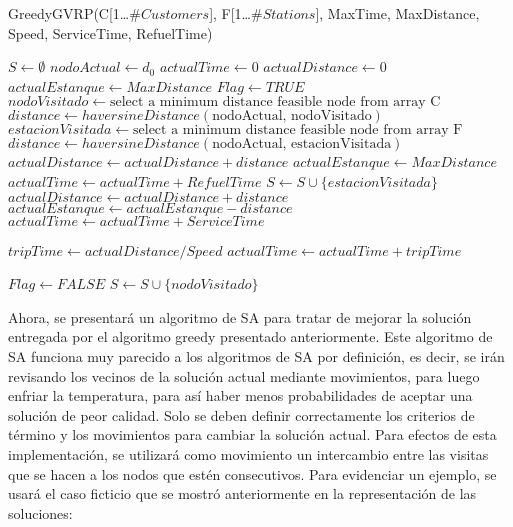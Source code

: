 \documentclass[letter, 10pt]{article}
\begin{document}
\begin{algorithm}
\caption{GreedyGVRP(C[1\ldots $\#Customers$], F[1\ldots $\#Stations$], MaxTime, MaxDistance, Speed,  ServiceTime, RefuelTime)}\label{alg:cap}
    \begin{algorithmic}
        \State $S \gets \emptyset$
        \State $nodoActual \gets d_0$
        \State $actualTime \gets 0$
        \State $actualDistance \gets 0$
        \State $actualEstanque \gets MaxDistance$
        \State $Flag \gets TRUE$
            \State $nodoVisitado \gets \text{select a minimum distance feasible node from array C}$
            \State $distance \gets haversineDistance(\text{nodoActual, nodoVisitado})$
                \State $estacionVisitada \gets \text{select a minimum distance feasible node from array F}$
                \State $distance \gets haversineDistance(\text{nodoActual, estacionVisitada})$
                \State $actualDistance \gets actualDistance + distance$
                \State $actualEstanque \gets MaxDistance$
                \State $actualTime \gets actualTime + RefuelTime$
                \State $S \gets S \cup \{estacionVisitada\}$
            \Else
                \State $actualDistance \gets actualDistance + distance$
                \State $actualEstanque \gets actualEstanque - distance$
                \State $actualTime \gets actualTime + ServiceTime$
            \EndIf
            
            \State $tripTime \gets actualDistance/Speed$
            \State $actualTime \gets actualTime + tripTime$

            
                \State $Flag \gets FALSE$
            \Else
                \State $S \gets S \cup \{nodoVisitado\}$
            \EndIf
        \EndWhile
    \end{algorithmic}
\end{algorithm}

\newpage
Ahora, se presentará un algoritmo de SA para tratar de mejorar la solución entregada por el algoritmo greedy presentado anteriormente. Este algoritmo de SA funciona muy parecido a los algoritmos de SA por definición, es decir, se irán revisando los vecinos de la solución actual mediante movimientos, para luego enfriar la temperatura, para así haber menos probabilidades de aceptar una solución de peor calidad. Solo se deben definir correctamente los criterios de término y los movimientos para cambiar la solución actual. Para efectos de esta implementación, se utilizará como movimiento un intercambio entre las visitas que se hacen a los nodos que estén consecutivos. Para evidenciar un ejemplo, se usará el caso ficticio que se mostró anteriormente en la representación de las soluciones:\\
\end{document}
